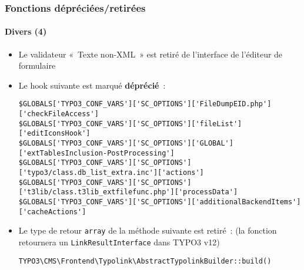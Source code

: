 %

\begin{frame}[fragile]
	\frametitle{Fonctions dépréciées/retirées}
	\framesubtitle{Divers (4)}


	\begin{itemize}
		\item Le validateur «~Texte non-XML~» est retiré de l'interface de l'éditeur de formulaire
		\item Le hook suivante est marqué \textbf{déprécié}~:
\begin{lstlisting}
$GLOBALS['TYPO3_CONF_VARS']['SC_OPTIONS']['FileDumpEID.php']['checkFileAccess']
$GLOBALS['TYPO3_CONF_VARS']['SC_OPTIONS']['fileList']['editIconsHook']
$GLOBALS['TYPO3_CONF_VARS']['SC_OPTIONS']['GLOBAL']['extTablesInclusion-PostProcessing']
$GLOBALS['TYPO3_CONF_VARS']['SC_OPTIONS']['typo3/class.db_list_extra.inc']['actions']
$GLOBALS['TYPO3_CONF_VARS']['SC_OPTIONS']['t3lib/class.t3lib_extfilefunc.php']['processData']
$GLOBALS['TYPO3_CONF_VARS']['SC_OPTIONS']['additionalBackendItems']['cacheActions']
\end{lstlisting}
		\item Le type de retour \texttt{array} de la méthode suivante est retiré~:\newline
			\smaller(la fonction retournera un \texttt{LinkResultInterface} dans TYPO3 v12)\normalsize
\begin{lstlisting}
TYPO3\CMS\Frontend\Typolink\AbstractTypolinkBuilder::build()
\end{lstlisting}

	\end{itemize}

\end{frame}


